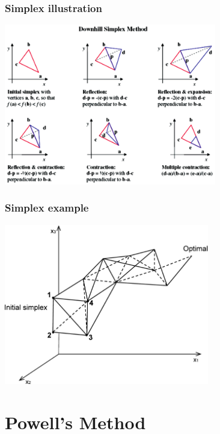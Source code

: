 \documentclass[10pt]{beamer}
\begin{document}
\begin{frame}
  \frametitle{Simplex illustration}
  \centerline{\includegraphics[height=7cm]{simplex}}
\end{frame}

\begin{frame}
  \frametitle{Simplex example}
  \centerline{\includegraphics[height=7cm]{simplex-example}}
\end{frame}

\section{Powell's Method}
\label{sec:powells-method}
\end{document}
